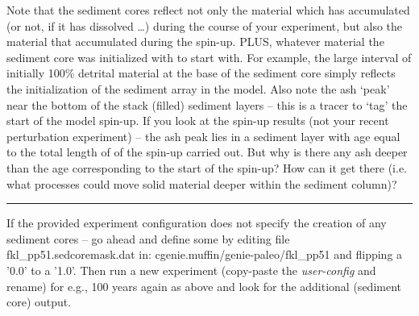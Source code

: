 Note that the sediment cores reflect not only the material which has accumulated (or not, if it has dissolved …) during the course of your experiment, but also the material that accumulated during the spin-up. PLUS, whatever material the sediment core was initialized with to start with. For example, the large interval of initially 100\% detrital material at the base of the sediment core simply reflects the initialization of the sediment array in the model. Also note the ash ‘peak’ near the bottom of the stack (filled) sediment layers – this is a tracer to ‘tag’ the start of the model spin-up. If you look at the spin-up results (not your recent perturbation experiment) – the ash peak lies in a sediment layer with age equal to the total length of of the spin-up carried out. But why is there any ash deeper than the age corresponding to the start of the spin-up? How can it get there (i.e. what processes could move solid material deeper within the sediment column)?

\vspace{1mm}
\noindent\rule{4cm}{0.1mm}
\vspace{2mm}

\noindent If the provided experiment configuration does not specify the creation of any sediment cores -- go ahead and define some by editing file \textsf{\footnotesize fkl\_pp51.sedcoremask.dat} in: \textsf{\footnotesize cgenie.muffin/genie-paleo/fkl\_pp51} and flipping a '0.0' to a '1.0'. Then run a new experiment (copy-paste the \textit{user-config} and rename) for e.g., 100 years again as above and look for the additional (sediment core) output.

\newpage


